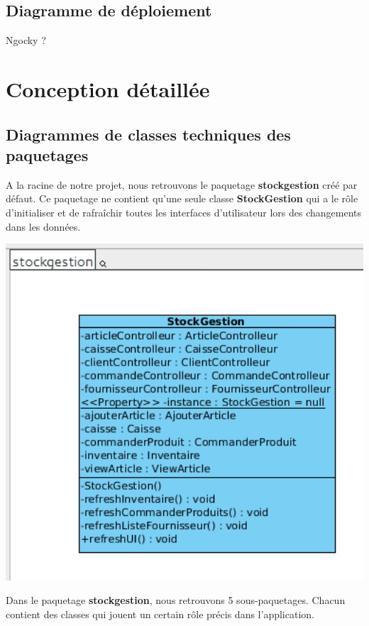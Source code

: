 \section{Diagramme de déploiement}

Ngocky ?


\chapter{Conception détaillée}

\section{Diagrammes de classes techniques des paquetages}

A la racine de notre projet, nous retrouvons le paquetage \textbf{stockgestion} créé par défaut. Ce paquetage ne contient qu'une seule classe \textbf{StockGestion} qui a le rôle d'initialiser et de rafraîchir toutes les interfaces d'utilisateur lors des changements dans les données.

\begin{center}
\includegraphics[width=14cm]{./Conception/stockgestion}
\end{center}

Dans le paquetage \textbf{stockgestion}, nous retrouvons 5 sous-paquetages. Chacun contient des classes qui jouent un certain rôle précis dans l'application.\\


